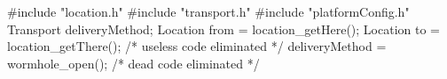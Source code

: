 #include "location.h"
#include "transport.h"
#include "platformConfig.h"
Transport deliveryMethod;
Location from = location_getHere();
Location to = location_getThere();
/* useless code eliminated */
deliveryMethod = wormhole_open();
/* dead code eliminated */